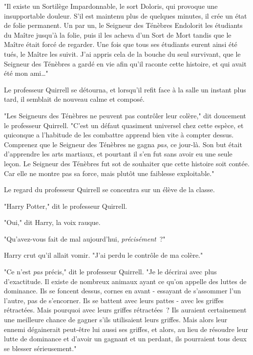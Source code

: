"Il existe un Sortilège Impardonnable, le sort Doloris, qui provoque une insupportable douleur. S'il est maintenu plus de quelques minutes, il crée un état de folie permanent. Un par un, le Seigneur des Ténèbres Endolorit les étudiants du Maître jusqu'à la folie, puis il les acheva d'un Sort de Mort tandis que le Maître était forcé de regarder. Une fois que tous ses étudiants eurent ainsi été tués, le Maître les suivit. J'ai appris cela de la bouche du seul survivant, que le Seigneur des Ténèbres a gardé en vie afin qu'il raconte cette histoire, et qui avait été mon ami…"

Le professeur Quirrell se détourna, et lorsqu'il refit face à la salle un instant plus tard, il semblait de nouveau calme et composé.

"Les Seigneurs des Ténèbres ne peuvent pas contrôler leur colère," dit doucement le professeur Quirrell. "C'est un défaut quasiment universel chez cette espèce, et quiconque a l'habitude de les combattre apprend bien vite à compter dessus. Comprenez que le Seigneur des Ténèbres ne gagna \emph{pas}, ce jour-là. Son but était d'apprendre les arts martiaux, et pourtant il s'en fut sans avoir eu une seule leçon. Le Seigneur des Ténèbres fut sot de souhaiter que cette histoire soit contée. Car elle ne montre pas sa force, mais plutôt une faiblesse exploitable."

Le regard du professeur Quirrell se concentra sur un élève de la classe.

"Harry Potter," dit le professeur Quirrell.

"Oui," dit Harry, la voix rauque.

"Qu'avez-vous fait de mal aujourd'hui, \emph{précisément}~?"

Harry crut qu'il allait vomir. "J'ai perdu le contrôle de ma colère."

"Ce n'est \emph{pas} précis," dit le professeur Quirrell. "Je le décrirai avec plus d'exactitude. Il existe de nombreux animaux ayant ce qu'on appelle des luttes de dominance. Ils se foncent dessus, cornes en avant - essayant de s'assommer l'un l'autre, pas de s'encorner. Ils se battent avec leurs pattes - avec les griffes rétractées. Mais pourquoi avec leurs griffes rétractées~? Ils auraient certainement une meilleure chance de gagner s'ils utilisaient leurs griffes. Mais alors leur ennemi dégainerait peut-être lui aussi ses griffes, et alors, au lieu de résoudre leur lutte de dominance et d'avoir un gagnant et un perdant, ils pourraient tous deux se blesser sérieusement."


